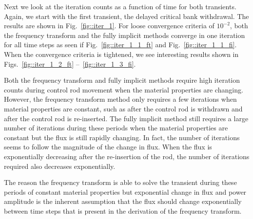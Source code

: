 \documentclass[12pt]{report}
\begin{document}
\clearpage
Next we look at the iteration counts as a function of time for both transients. Again, we start with the first transient, the delayed critical bank withdrawal. The results are shown in Fig.~\ref{fig::iter_1}. For loose convergence criteria of $10^{-2}$, both the frequency transform and the fully implicit methods converge in one iteration for all time steps as seen if Fig.~\ref{fig::iter_1_1_ft} and Fig.~\ref{fig::iter_1_1_fi}. When the convergence criteria is tightened, we see interesting results shown in Figs.~\ref{fig::iter_1_2_ft} --~\ref{fig::iter_1_3_fi}. 

Both the frequency transform and fully implicit methods require high iteration counts during control rod movement when the material properties are changing. However, the frequency transform method only requires a few iterations when material properties are constant, such as after the control rod is withdrawn and after the control rod is re-inserted. The fully implicit method still requires a large number of iterations during these periods when the material properties are constant but the flux is still rapidly changing. In fact, the number of iterations seems to follow the magnitude of the change in flux. When the flux is exponentially decreasing after the re-insertion of the rod, the number of iterations required also decreases exponentially. 

The reason the frequency transform is able to solve the transient during these periods of constant material properties but exponential change in flux and power amplitude is the inherent assumption that the flux should change exponentially between time steps that is present in the derivation of the frequency transform.
\end{document}
